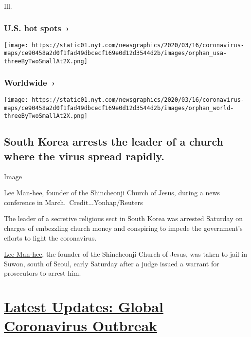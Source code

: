 Ill.

\href{https://www.nytimes.com/interactive/2020/us/coronavirus-us-cases.html}{}

\hypertarget{us-hot-spots-}{%
\subsubsection{U.S. hot spots~›}\label{us-hot-spots-}}

\texttt{[image: https://static01.nyt.com/newsgraphics/2020/03/16/coronavirus-maps/ce90458a2d0f1fad49dbcecf169e0d12d3544d2b/images/orphan\_usa-threeByTwoSmallAt2X.png]}

\href{https://www.nytimes.com/interactive/2020/world/coronavirus-maps.html}{}

\hypertarget{worldwide-}{%
\subsubsection{Worldwide~›}\label{worldwide-}}

\texttt{[image: https://static01.nyt.com/newsgraphics/2020/03/16/coronavirus-maps/ce90458a2d0f1fad49dbcecf169e0d12d3544d2b/images/orphan\_world-threeByTwoSmallAt2X.png]}

\hypertarget{south-korea-arrests-the-leader-of-a-church-where-the-virus-spread-rapidly}{%
\subsection{South Korea arrests the leader of a church where the virus
spread
rapidly.}\label{south-korea-arrests-the-leader-of-a-church-where-the-virus-spread-rapidly}}

Image

Lee Man-hee, founder of the Shincheonji Church of Jesus, during a news
conference in March.~Credit...Yonhap/Reuters

The leader of a secretive religious sect in South Korea was arrested
Saturday on charges of embezzling church money and conspiring to impede
the government's efforts to fight the coronavirus.

\href{https://www.nytimes.com/2020/03/02/world/asia/coronavirus-south-korea-shincheonji.html?searchResultPosition=1}{Lee
Man-hee,} the founder of the Shincheonji Church of Jesus, was taken to
jail in Suwon, south of Seoul, early Saturday after a judge issued a
warrant for prosecutors to arrest him.

\hypertarget{latest-updates-global-coronavirus-outbreak}{%
\section{\texorpdfstring{\href{https://www.nytimes.com/2020/08/01/world/coronavirus-covid-19.html?action=click\&pgtype=Article\&state=default\&region=MAIN_CONTENT_1\&context=storylines_live_updates}{Latest
Updates: Global Coronavirus
Outbreak}}{Latest Updates: Global Coronavirus Outbreak}}\label{latest-updates-global-coronavirus-outbreak}}

